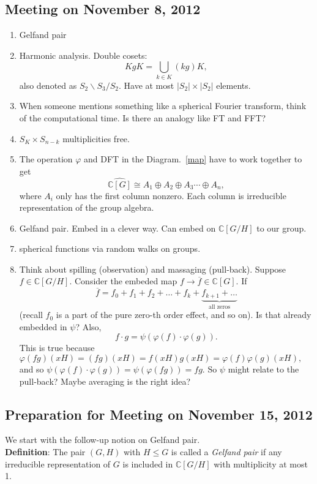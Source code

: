 \documentclass[10pt,reqno]{amsart}
\renewcommand{\phi}{\varphi}
\newcommand{\C}{\mathbb{C}}
\theoremstyle{definition}
\numberwithin{equation}{section}
\begin{document}
\subsection{Meeting on November 8, 2012}
\begin{enumerate}
\item Gelfand pair
\item Harmonic analysis. Double cosets:
\[KgK = \bigcup_{k\in K} (kg)K,\]
also denoted as $S_2\backslash S_3/S_2.$
Have at most $|S_2|\times |S_2|$ elements.
\item When someone mentions something like
a spherical Fourier transform, think
of the computational time. Is there
an analogy like FT and FFT?
\item $S_K\times S_{n-k}$ multiplicities free.
\item The operation $\varphi$ and 
DFT in the Diagram.~\eqref{map} have
to work together to get
\[\widehat{\C[G]}\cong
A_1\oplus A_2\oplus A_3\cdots \oplus A_n,\]
where $A_i$ only has the first column
nonzero. Each column is irreducible representation
of the group algebra.
\item Gelfand pair. Embed in a clever way.
Can embed on $\C[G/H]$ to our group.
\item spherical functions via random walks
on groups.
\item Think about spilling (observation) and massaging (pull-back).
Suppose $f\in \C[G/H].$
Consider the embeded map
$f\to \overline{f}\in \C[G]$.
If 
\[\overline{f} = f_0 + f_1 + f_2 + \ldots
+ f_k + \underbrace{ f_{k+1} + \ldots}_{\text{all zeros}} \]
(recall $f_0$ is a part of the pure zero-th order
effect, and so on). Is that already embedded in $\psi$?
Also,
\begin{equation}
\label{preserve}
f\cdot g = \psi(\varphi(f)\cdot \varphi(g)).
\end{equation}
This is true because $\phi(fg)(xH)
=(fg)(xH) = f(xH)g(xH)= \varphi(f)\varphi(g)(xH),$
and so $\psi(\varphi(f)\cdot \varphi(g))
= \psi(\varphi(fg)) = fg.$
So $\psi$ might relate to the pull-back?
Maybe averaging is the right idea?
\end{enumerate}

\subsection{Preparation for Meeting on November 15, 2012}
We start with the follow-up notion on 
Gelfand pair.\\
\textbf{Definition}:
The pair $(G, H)$ with
$H\leq G$ is called a \textit{Gelfand pair}
if any irreducible representation of $G$
is included in $\C[G/H]$ with 
multiplicity at most 1.
\end{document}
